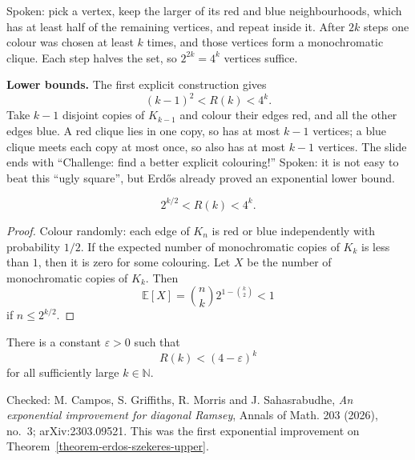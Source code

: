 Spoken: pick a vertex, keep the larger of
its red and blue neighbourhoods, which has at
least half of the remaining vertices, and
repeat inside it. After $2k$ steps one colour
was chosen at least $k$ times, and those
vertices form a monochromatic clique. Each
step halves the set, so $2^{2k} = 4^k$
vertices suffice.

\medskip\noindent
{\bf Lower bounds.} The first explicit
construction gives
$$
(k-1)^2 < R(k) < 4^k.
$$
Take $k-1$ disjoint copies of $K_{k-1}$ and
colour their edges red, and all the other
edges blue. A red clique lies in one copy, so
has at most $k-1$ vertices; a blue clique
meets each copy at most once, so also has at
most $k-1$ vertices. The slide ends with
``Challenge: find a better explicit
colouring!'' Spoken: it is not easy to beat
this ``ugly square'', but Erd\H{o}s already
proved an exponential lower bound.

\begin{theorem}[Erd\H{o}s, 1947]
\label{theorem-erdos-1947}
$$
2^{k/2} < R(k) < 4^k.
$$
\end{theorem}

\begin{proof}
Colour randomly: each edge of $K_n$ is red or
blue independently with probability $1/2$.
If the expected number of monochromatic
copies of $K_k$ is less than $1$, then it is
zero for some colouring. Let $X$ be the
number of monochromatic copies of $K_k$. Then
$$
\mathbb{E}[X]
= \binom{n}{k} 2^{1 - \binom{k}{2}}
< 1
$$
if $n \le 2^{k/2}$.
\end{proof}

\begin{theorem}
\label{theorem-cgms}
There is a constant $\varepsilon > 0$ such
that
$$
R(k) < (4 - \varepsilon)^k
$$
for all sufficiently large $k \in
\mathbb{N}$.
\end{theorem}

\noindent
Checked: M. Campos, S. Griffiths, R. Morris
and J. Sahasrabudhe, \emph{An exponential
improvement for diagonal Ramsey}, Annals of
Math. 203 (2026), no.~3; arXiv:2303.09521.
This was the first exponential improvement
on
Theorem~\ref{theorem-erdos-szekeres-upper}.

